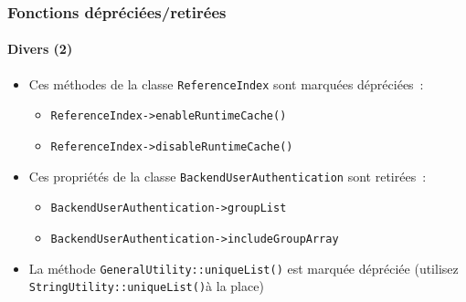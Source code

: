 %

\begin{frame}[fragile]
	\frametitle{Fonctions dépréciées/retirées}
	\framesubtitle{Divers (2)}

	\begin{itemize}
		\item Ces méthodes de la classe \texttt{ReferenceIndex} sont marquées dépréciées~:
			\begin{itemize}\smaller
				\item \texttt{ReferenceIndex->enableRuntimeCache()}
				\item \texttt{ReferenceIndex->disableRuntimeCache()}
			\end{itemize}\normalsize

		\item Ces propriétés de la classe \texttt{BackendUserAuthentication} sont retirées~:
			\begin{itemize}\smaller
				\item \texttt{BackendUserAuthentication->groupList}
				\item \texttt{BackendUserAuthentication->includeGroupArray}
			\end{itemize}\normalsize

		\item La méthode \texttt{GeneralUtility::uniqueList()} est marquée dépréciée
			(utilisez \smaller\texttt{StringUtility::uniqueList()}\normalsize à la place)

	\end{itemize}

\end{frame}

